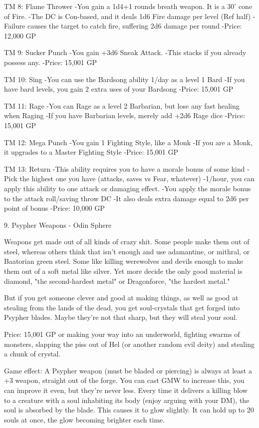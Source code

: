 \begin{multicols}{2}
TM 8: Flame Thrower
-You gain a 1d4+1 rounds breath weapon. It is a 30' cone of Fire.
-The DC is Con-based, and it deals 1d6 Fire damage per level (Ref half)
-Failure causes the target to catch fire, suffering 2d6 damage per round
-Price: 12,000 GP

TM 9: Sucker Punch
-You gain +3d6 Sneak Attack.
-This stacks if you already possess any.
-Price: 15,001 GP

TM 10: Sing
-You can use the Bardsong ability 1/day as a level 1 Bard
-If you have bard levels, you gain 2 extra uses of your Bardsong
-Price: 15,001 GP

TM 11: Rage
-You can Rage as a level 2 Barbarian, but lose any fast healing when Raging
-If you have Barbarian levels, merely add +2d6 Rage dice
-Price: 15,001 GP

TM 12: Mega Punch
-You gain 1 Fighting Style, like a Monk
-If you are a Monk, it upgrades to a Master Fighting Style
-Price: 15,001 GP

TM 13: Return
-This ability requires you to have a morale bonus of some kind
-Pick the highest one you have (attacks, saves vs Fear, whatever)
-1/hour, you can apply this ability to one attack or damaging effect.
-You apply the morale bonus to the attack roll/saving throw DC
-It also deals extra damage equal to 2d6 per point of bonus
-Price: 10,000 GP



9. Psypher Weapons - Odin Sphere

Weapons get made out of all kinds of crazy shit. Some people make them out of steel, whereas others think that isn't enough and use adamantine, or mithral, or Baatorian green steel. Some like killing werewolves and devils enough to make them out of a soft metal like silver. Yet more decide the only good material is diamond, "the second-hardest metal" or Dragonforce, "the hardest metal."

But if you get someone clever and good at making things, as well as good at stealing from the lands of the dead, you get soul-crystals that get forged into Psypher blades. Maybe they're not that sharp, but they will steal your soul.

Price: 15,001 GP or making your way into an underworld, fighting swarms of monsters, slapping the piss out of Hel (or another random evil deity) and stealing a chunk of crystal.

Game effect:
A Psypher weapon (must be bladed or piercing) is always at least a +3 weapon, straight out of the forge. You can cast GMW to increase this, you can improve it even, but they're never less. Every time it delivers a killing blow to a creature with a soul inhabiting its body (enjoy arguing with your DM), the soul is absorbed by the blade. This causes it to glow slightly. It can hold up to 20 souls at once, the glow becoming brighter each time.


\end{multicols}
